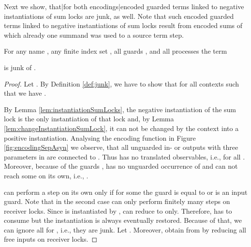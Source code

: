 \documentclass[]{llncs}
\begin{document}
Next we show, that|for both encodings|encoded guarded terms linked to negative instantiations of sum locks are junk, as well. Note that such encoded guarded terms linked to negative instantiations of sum locks result from encoded sums of which already one summand was used to \simulate a source term step.

\begin{lemma} \label{lem:junkRemainsOfSumsSepAsyn}
	For any name , any finite index set , all guards , and all processes  the term
	
	is junk of .
\end{lemma}

\begin{proof}
	Let . By Definition \ref{def:junk}, we have to show that for all contexts  such that  we have .
	
	By Lemma \ref{lem:instantiationSumLocks}, the negative instantiation of the sum lock  is the only instantiation of that lock and, by Lemma \ref{lem:changeInstantiationSumLock}, it can not be changed by the context into a positive instantiation. Analysing the encoding function in Figure \ref{fig:encodingSepAsyn} we observe, that all unguarded in- or outputs with three parameters in  are connected to . Thus  has no translated observables, i.e.,  for all . Moreover, because of the guards ,  has no unguarded occurrence of  and can not reach some on its own, i.e., .
	
	 can perform a step on its own only if for some  the guard  is equal to  or is an input guard. Note that in the second case  can only perform finitely many steps on receiver locks. Since  is instantiated by ,  can reduce to  only. Therefore,  has to consume  but the instantiation is always eventually restored. Because of that, we can ignore all  for , i.e., they are junk. Let . Moreover, obtain  from  by reducing all free inputs on receiver locks.
	

\end{proof}
\end{document}
